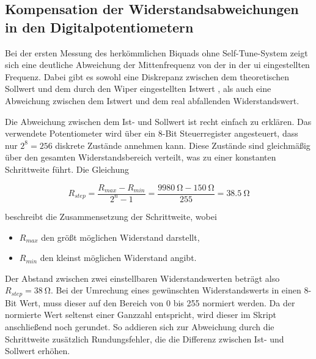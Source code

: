 \documentclass[../main_config.tex]{subfiles}
\begin{document}
\subsection{Kompensation der Widerstandsabweichungen in den Digitalpotentiometern}

Bei der ersten Messung des herkömmlichen Biquads ohne Self-Tune-System zeigt sich eine deutliche Abweichung der Mittenfrequenz von der in der \gls{ui} eingestellten Frequenz. Dabei gibt es sowohl eine Diskrepanz zwischen dem theoretischen Sollwert  und dem durch den Wiper eingestellten Istwert , als auch eine Abweichung zwischen dem Istwert und dem real abfallenden Widerstandswert. \par
\medskip

Die Abweichung zwischen dem Ist- und Sollwert ist recht einfach zu erklären. Das verwendete Potentiometer wird über ein \num{8}-Bit Steuerregister angesteuert, dass nur $2 ^8= 256$ diskrete Zustände annehmen kann. Diese Zustände sind gleichmäßig über den gesamten Widerstandsbereich verteilt, was zu einer konstanten Schrittweite führt. Die Gleichung\par
\medskip

\begin{equation}
    R_{step} = \frac{R_{max}-R_{min}}{2^{n}-1} = \frac{\SI{9980}{\ohm}-\SI{150}{\ohm}}{255} = \SI{38.5}{\ohm}
\end{equation}

beschreibt die Zusammensetzung der Schrittweite, wobei
\begin{itemize}
    \item $R_{max}$ den größt möglichen Widerstand darstellt,
    \item $R_{min}$ den kleinst möglichen Widerstand angibt.
\end{itemize}

Der Abstand zwischen zwei einstellbaren Widerstandswerten beträgt also $R_{step}=\SI{38}{\ohm}$. Bei der Umrechung eines gewünschten Widerstandswerts in einen \num{8}-Bit Wert, muss dieser auf den Bereich von \num{0} bis \num{255} normiert werden. Da der normierte Wert seltenst einer Ganzzahl entspricht, wird dieser im Skript anschließend noch gerundet. So addieren sich zur Abweichung durch die Schrittweite zusätzlich Rundungsfehler, die die Differenz zwischen Ist- und Sollwert erhöhen. \par
\medskip

\end{document}
